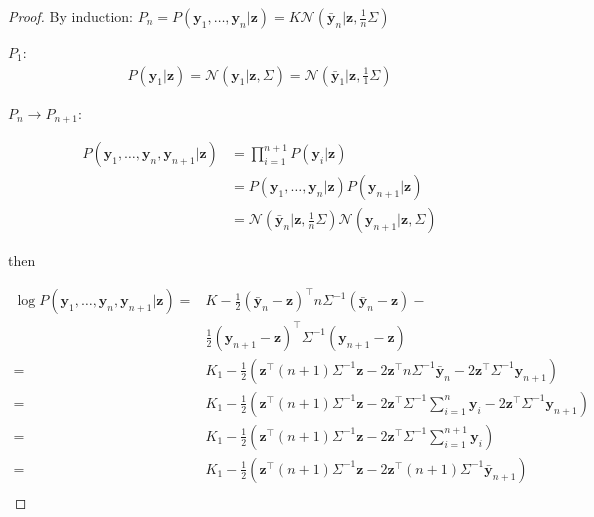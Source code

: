 \documentclass[12pt]{article}
\begin{document}
\begin{proof}
    By induction:
    $P_n=P(\mathbf{y}_1,\ldots,\mathbf{y}_n|\mathbf{z})=K\mathcal{N}(\bar{\mathbf{y}}_n|\mathbf{z},\frac{1}{n}\Sigma)$

    $P_1$:
    \begin{align*}
        P(\mathbf{y}_1|\mathbf{z})=\mathcal{N}(\mathbf{y}_1|\mathbf{z},\Sigma)=\mathcal{N}(\bar{\mathbf{y}}_1|\mathbf{z},\frac{1}{1}\Sigma)
    \end{align*}

    $P_n\rightarrow P_{n+1}$:

    \begin{align*}
        P(\mathbf{y}_1,\ldots,\mathbf{y}_n,\mathbf{y}_{n+1}|\mathbf{z})&=\prod_{i=1}^{n+1} P(\mathbf{y}_i|\mathbf{z})\\
                  &=P(\mathbf{y}_1,\ldots,\mathbf{y}_n|\mathbf{z})P(\mathbf{y}_{n+1}|\mathbf{z})\\
                  &=\mathcal{N}(\bar{\mathbf{y}}_n|\mathbf{z},\frac{1}{n}\Sigma)\mathcal{N}(\mathbf{y}_{n+1}|\mathbf{z},\Sigma)
    \end{align*}

    \noindent then

    \begin{align*}
        \log
        P(\mathbf{y}_1,\ldots,\mathbf{y}_n,\mathbf{y}_{n+1}|\mathbf{z})=&K-\frac{1}{2}(\bar{\mathbf{y}}_n-\mathbf{z})^\intercal
        n\Sigma^{-1}(\bar{\mathbf{y}}_n-\mathbf{z})-\\
        &\frac{1}{2}(\mathbf{y}_{n+1}-\mathbf{z})^\intercal\Sigma^{-1}(\mathbf{y}_{n+1}-\mathbf{z})\\
        =&K_1-\frac{1}{2}\left(\mathbf{z}^\intercal(n+1)\Sigma^{-1}\mathbf{z}-2\mathbf{z}^\intercal n\Sigma^{-1}\bar{\mathbf{y}}_n-2\mathbf{z}^\intercal\Sigma^{-1}\mathbf{y}_{n+1}\right)\\
        =&K_1-\frac{1}{2}\left(\mathbf{z}^\intercal(n+1)\Sigma^{-1}\mathbf{
            z}-2\mathbf{z}^\intercal \Sigma^{-1}\sum_{i=1}^n\mathbf{y}_i-2\mathbf{z}^\intercal\Sigma^{-1}\mathbf{y}_{n+1}\right)\\
        =&K_1-\frac{1}{2}\left(\mathbf{z}^\intercal(n+1)\Sigma^{-1}\mathbf{
            z}-2\mathbf{z}^\intercal\Sigma^{-1}\sum_{i=1}^{n+1}\mathbf{y}_i\right)\\
        =&K_1-\frac{1}{2}\left(\mathbf{z}^\intercal(n+1)\Sigma^{-1}\mathbf{
            z}-2\mathbf{z}^\intercal(n+1)\Sigma^{-1}\bar{\mathbf{y}}_{n+1}\right)\\
    \end{align*}


\end{proof}
\end{document}

